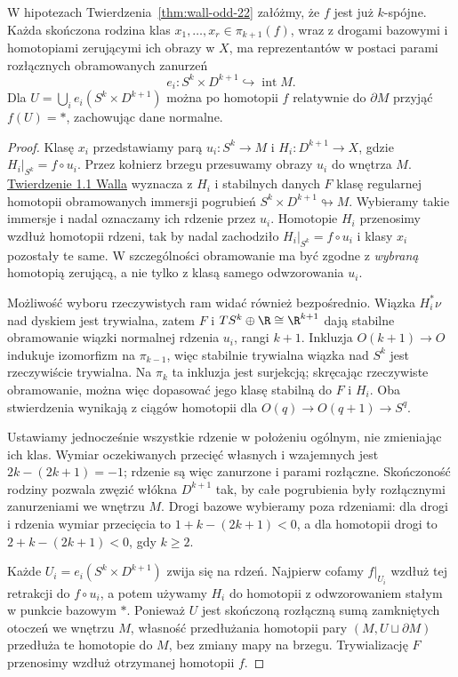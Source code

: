 \begin{lemat}
\label{lem:wall-odd-rozlaczne-sfery-22}
W hipotezach Twierdzenia~\ref{thm:wall-odd-22}
załóżmy, że $f$ jest już $k$-spójne.
Każda skończona rodzina klas
$x_1,\ldots,x_r\in\pi_{k+1}(f)$, wraz
z drogami bazowymi i homotopiami zerującymi
ich obrazy w $X$, ma reprezentantów w postaci
parami rozłącznych obramowanych zanurzeń
\[
 e_i:S^k\times D^{k+1}\hookrightarrow
       \operatorname{int}M.
\]
Dla $U=\bigcup_i e_i(S^k\times D^{k+1})$
można po homotopii $f$ relatywnie do $\partial M$
przyjąć $f(U)=*$, zachowując dane normalne.
\end{lemat}
\begin{proof}
Klasę $x_i$ przedstawiamy parą
$u_i:S^k\to M$ i $H_i:D^{k+1}\to X$,
gdzie $H_i|_{S^k}=f\circ u_i$.
Przez kołnierz brzegu przesuwamy obrazy
$u_i$ do wnętrza $M$.
\href{https://www.maths.ed.ac.uk/~v1ranick/books/scm.pdf}
{Twierdzenie 1.1 Walla} wyznacza z $H_i$
i stabilnych danych $F$ klasę regularnej
homotopii obramowanych immersji pogrubień
$S^k\times D^{k+1}\looparrowright M$.
Wybieramy takie immersje i nadal oznaczamy
ich rdzenie przez $u_i$.
Homotopie $H_i$ przenosimy wzdłuż homotopii
rdzeni, tak by nadal zachodziło
$H_i|_{S^k}=f\circ u_i$ i klasy $x_i$
pozostały te same.
W szczególności obramowanie ma być zgodne
z \emph{wybraną} homotopią zerującą, a nie
tylko z klasą samego odwzorowania $u_i$.

Możliwość wyboru rzeczywistych ram widać
również bezpośrednio. Wiązka $H_i^*\nu$
nad dyskiem jest trywialna, zatem $F$
i $TS^k\oplus\R\cong\R^{k+1}$ dają
stabilne obramowanie wiązki normalnej
rdzenia $u_i$, rangi $k+1$.
Inkluzja $O(k+1)\to O$ indukuje izomorfizm
na $\pi_{k-1}$, więc stabilnie trywialna
wiązka nad $S^k$ jest rzeczywiście trywialna.
Na $\pi_k$ ta inkluzja jest surjekcją;
skręcając rzeczywiste obramowanie, można
więc dopasować jego klasę stabilną do $F$
i $H_i$. Oba stwierdzenia wynikają z ciągów
homotopii dla $O(q)\to O(q+1)\to S^q$.

Ustawiamy jednocześnie wszystkie rdzenie
w położeniu ogólnym, nie zmieniając ich klas.
Wymiar oczekiwanych przecięć własnych
i wzajemnych jest
$2k-(2k+1)=-1$; rdzenie są więc zanurzone
i parami rozłączne. Skończoność rodziny
pozwala zwęzić włókna $D^{k+1}$ tak, by
całe pogrubienia były rozłącznymi zanurzeniami
we wnętrzu $M$. Drogi bazowe wybieramy poza
rdzeniami: dla drogi i rdzenia wymiar przecięcia
to $1+k-(2k+1)<0$, a dla homotopii drogi
to $2+k-(2k+1)<0$, gdy $k\geq2$.

Każde $U_i=e_i(S^k\times D^{k+1})$ zwija się
na rdzeń. Najpierw cofamy $f|_{U_i}$ wzdłuż
tej retrakcji do $f\circ u_i$, a potem
używamy $H_i$ do homotopii z odwzorowaniem
stałym w punkcie bazowym $*$.
Ponieważ $U$ jest skończoną rozłączną sumą
zamkniętych otoczeń we wnętrzu $M$,
własność przedłużania homotopii pary
$(M,U\sqcup\partial M)$ przedłuża te
homotopie do $M$, bez zmiany mapy na brzegu.
Trywializację $F$ przenosimy wzdłuż
otrzymanej homotopii $f$.
\end{proof}

